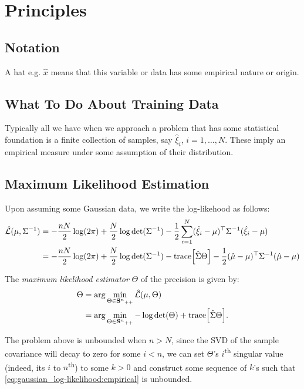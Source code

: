 \chapter{Principles}

\section{Notation}

A hat e.g. $\hat{x}$ means that this variable or data has some 
empirical nature or origin.

\section{What To Do About Training Data}

Typically all we have when we approach a problem that has some
statistical foundation is a finite collection of samples, say
$\hat{\xi}_i$, $i=1,\ldots,N$. These imply an empirical measure under some
assumption of their distribution.

\section{Maximum Likelihood Estimation}

Upon assuming some Gaussian data, we write the log-likehood
as follows:
\begin{align}
\hat{\mathcal{L}}(\mu, \Sigma^{-1}) & = -\frac{nN}{2}\log(2\pi)
+ \frac N2\log\det(\Sigma^{-1}) - \frac 12 \sum_{i=1}^N (\hat{\xi}_i - \mu)^\top\Sigma^{-1} (\hat{\xi}_i - \mu)\nonumber\\
& = -\frac{nN}{2}\log(2\pi)
+ \frac N2\log\det(\Sigma^{-1})
- \textnormal{trace}\Big[ \hat{\Sigma}\Theta \Big] - 
\frac 12  (\hat{\mu} - \mu)^\top\Sigma^{-1} (\hat{\mu} - \mu)
\label{eq:gaussian_log-likelihood}
\end{align}

The \emph{maximum likelihood estimator} $\Theta$ of the precision 
is given by:
\begin{align}
\Theta & = \arg\min_{\Theta\in{{\mathbf{S}^n}_{++}}} \hat{\mathcal{L}}(\mu, \Theta)\nonumber\\
 & = \arg\min_{\Theta\in{{\mathbf{S}^n}_{++}}} -\log\det(\Theta)
 + \textnormal{trace}\Big[ \hat{\Sigma} \Theta \Big].\label{eq:gaussian_log-likelihood:empirical}
\end{align}

The problem above is unbounded when $n>N$, since the SVD of the
sample covariance will decay to zero for some $i<n$, we can set
$\Theta$'s $i$\textsuperscript{th} singular value (indeed, its $i$ 
to $n$\textsuperscript{th}) to some $k>0$ and construct some
sequence of $k$'s such that 
\eqref{eq:gaussian_log-likelihood:empirical} is unbounded.